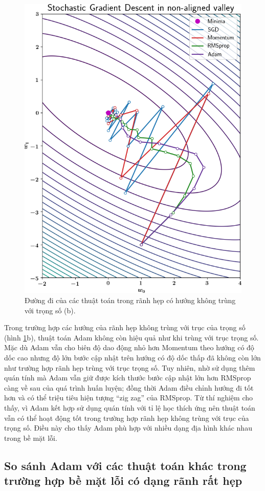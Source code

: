 \begin{figure}[htp]
	\centering
	\includegraphics[width=100 mm]{images/nonaligned.png}
	\caption{Đường đi của các thuật toán trong rãnh hẹp có hướng không trùng với trọng số (b).}
	\label{fig:aligned-nonaligned}
\end{figure}

Trong trường hợp các hướng của rãnh hẹp không trùng với trục của trọng số (hình \ref{fig:aligned-nonaligned}b), thuật toán Adam không còn hiệu quả như khi trùng với trục trọng số. Mặc dù Adam vẫn cho biên độ dao động nhỏ hơn Momentum theo hướng có độ dốc cao nhưng độ lớn bước cập nhật trên hướng có độ dốc thấp đã không còn lớn như trường hợp rãnh hẹp trùng với trục trọng số. Tuy nhiên, nhờ sử dụng thêm quán tính mà Adam vẫn giữ được kích thước bước cập nhật lớn hơn RMSprop càng về sau của quá trình huấn luyện; đồng thời Adam điều chỉnh hướng đi tốt hơn và có thể triệu tiêu hiện tượng ``zig zag'' của RMSprop. Từ thí nghiệm cho thấy, vì Adam kết hợp sử dụng quán tính với tỉ lệ học thích ứng nên thuật toán vẫn có thể hoạt động tốt trong trường hợp rãnh hẹp không trùng với trục của trọng số. Điều này cho thấy Adam phù hợp với nhiều dạng địa hình khác nhau trong bề mặt lỗi.

\subsection{So sánh Adam với các thuật toán khác trong trường hợp bề mặt lỗi có dạng rãnh rất hẹp}
\label{exp:sparse-noisy}

